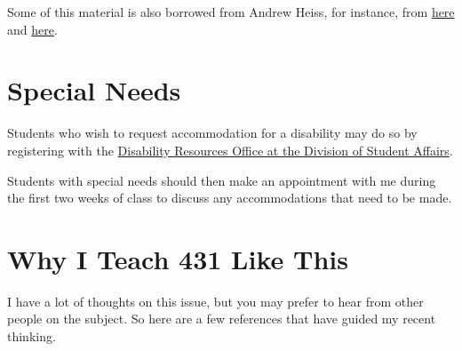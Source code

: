 \documentclass[
]{book}
\begin{document}
Some of this material is also borrowed from Andrew Heiss, for instance, from \href{https://evalf19.classes.andrewheiss.com/syllabus/}{here} and \href{https://econf20.classes.andrewheiss.com/syllabus/}{here}.

\hypertarget{special-needs}{%
\section{Special Needs}\label{special-needs}}

Students who wish to request accommodation for a disability may do so by registering with the \href{https://case.edu/studentlife/disability/}{Disability Resources Office at the Division of Student Affairs}.

Students with special needs should then make an appointment with me during the first two weeks of class to discuss any accommodations that need to be made.

\hypertarget{why-i-teach-431-like-this}{%
\section{Why I Teach 431 Like This}\label{why-i-teach-431-like-this}}

I have a lot of thoughts on this issue, but you may prefer to hear from other people on the subject. So here are a few references that have guided my recent thinking.
\end{document}
